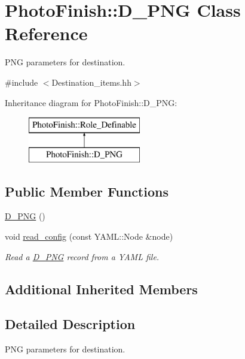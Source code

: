 \hypertarget{class_photo_finish_1_1_d___p_n_g}{}\section{Photo\+Finish\+:\+:D\+\_\+\+P\+NG Class Reference}
\label{class_photo_finish_1_1_d___p_n_g}


P\+NG parameters for destination.  




{\ttfamily \#include $<$Destination\+\_\+items.\+hh$>$}

Inheritance diagram for Photo\+Finish\+:\+:D\+\_\+\+P\+NG\+:\begin{figure}[H]
\begin{center}
\leavevmode
\includegraphics[height=2.000000cm]{class_photo_finish_1_1_d___p_n_g}
\end{center}
\end{figure}
\subsection*{Public Member Functions}
\begin{DoxyCompactItemize}
\item 
\hyperlink{class_photo_finish_1_1_d___p_n_g_acaefeb530af1932e10a17f99de4f3091}{D\+\_\+\+P\+NG} ()
\item 
void \hyperlink{class_photo_finish_1_1_d___p_n_g_ad1db13836f032b95d5b0a3d63aa95d81}{read\+\_\+config} (const Y\+A\+M\+L\+::\+Node \&node)
\begin{DoxyCompactList}\small\item\em Read a \hyperlink{class_photo_finish_1_1_d___p_n_g}{D\+\_\+\+P\+NG} record from a Y\+A\+ML file. \end{DoxyCompactList}\end{DoxyCompactItemize}
\subsection*{Additional Inherited Members}


\subsection{Detailed Description}
P\+NG parameters for destination. 

